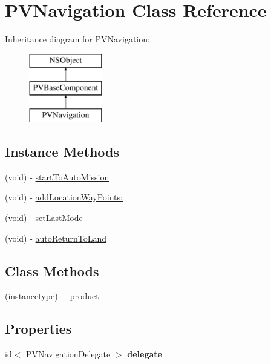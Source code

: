 \hypertarget{interface_p_v_navigation}{}\section{P\+V\+Navigation Class Reference}
\label{interface_p_v_navigation}
Inheritance diagram for P\+V\+Navigation\+:\begin{figure}[H]
\begin{center}
\leavevmode
\includegraphics[height=3.000000cm]{interface_p_v_navigation}
\end{center}
\end{figure}
\subsection*{Instance Methods}
\begin{DoxyCompactItemize}
\item 
(void) -\/ \hyperlink{interface_p_v_navigation_abc96a899a090af309b1a9cfa529068f7}{start\+To\+Auto\+Mission}
\item 
(void) -\/ \hyperlink{interface_p_v_navigation_a3b5f235a3e682bee46acdf3e5ff8c1cc}{add\+Location\+Way\+Points\+:}
\item 
(void) -\/ \hyperlink{interface_p_v_navigation_a4b32f3fa3ac406334f043450ee2b04d1}{set\+Last\+Mode}
\item 
(void) -\/ \hyperlink{interface_p_v_navigation_a4229fe550a53b929e5ec054f99b14415}{auto\+Return\+To\+Land}
\end{DoxyCompactItemize}
\subsection*{Class Methods}
\begin{DoxyCompactItemize}
\item 
(instancetype) + \hyperlink{interface_p_v_navigation_ab01dfd18c85bc6060b38dde4803f6728}{product}
\end{DoxyCompactItemize}
\subsection*{Properties}
\begin{DoxyCompactItemize}
\item 
\mbox{\label{interface_p_v_navigation_ac756d987a2c344d2f2bd4951a375cef2}} 
id$<$ P\+V\+Navigation\+Delegate $>$ {\bfseries delegate}
\end{DoxyCompactItemize}


